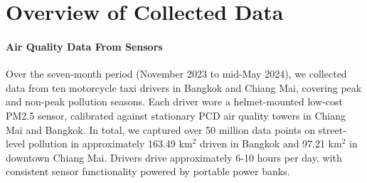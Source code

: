 \section{Overview of Collected Data}
\label{sec:result-overview-data}

\paragraph{Air Quality Data From Sensors}
Over the seven-month period (November 2023 to mid-May 2024), we collected data from ten motorcycle taxi drivers in Bangkok and Chiang Mai, covering peak and non-peak pollution seasons.
Each driver wore a helmet-mounted low-cost PM2.5 sensor, calibrated against stationary PCD air quality towers in Chiang Mai and Bangkok.
In total, we captured over 50 million data points on street-level pollution in approximately 163.49 km$^2$ driven in Bangkok and 97.21 km$^2$ in downtown Chiang Mai.
Drivers drive approximately 6-10 hours per day, with consistent sensor functionality powered by portable power banks.



